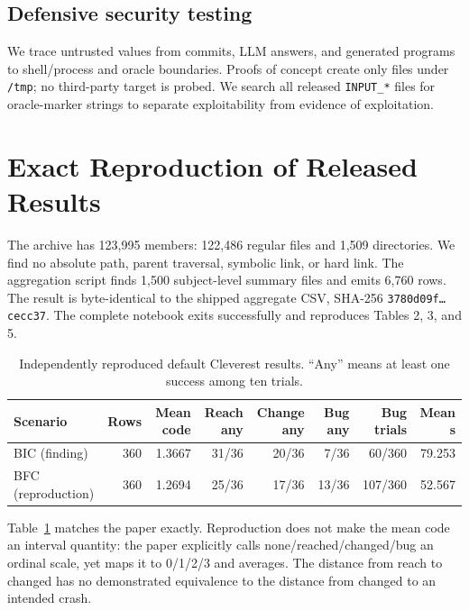 \documentclass{article}
\begin{document}
\subsection{Defensive security testing}

We trace untrusted values from commits, LLM answers, and generated programs to
shell/process and oracle boundaries.  Proofs of concept create only files under
\texttt{/tmp}; no third-party target is probed.  We search all released
\texttt{INPUT\_*} files for oracle-marker strings to separate exploitability
from evidence of exploitation.

\section{Exact Reproduction of Released Results}
\label{sec:reproduction}

The archive has 123,995 members: 122,486 regular files and 1,509 directories.
We find no absolute path, parent traversal, symbolic link, or hard link.  The
aggregation script finds 1,500 subject-level summary files and emits 6,760
rows.  The result is byte-identical to the shipped aggregate CSV, SHA-256
\texttt{3780d09f\ldots cecc37}.  The complete notebook exits successfully and
reproduces Tables 2, 3, and 5.

\begin{table}[H]
\centering
\caption{Independently reproduced default Cleverest results.  ``Any'' means at
least one success among ten trials.}
\label{tab:default}
\small
\begin{tabular}{lrrrrrrr}
\toprule
Scenario & Rows & Mean code & Reach any & Change any & Bug any & Bug trials & Mean s\\
\midrule
BIC (finding) & 360 & 1.3667 & 31/36 & 20/36 & 7/36 & 60/360 & 79.253\\
BFC (reproduction) & 360 & 1.2694 & 25/36 & 17/36 & 13/36 & 107/360 & 52.567\\
\bottomrule
\end{tabular}
\end{table}

Table~\ref{tab:default} matches the paper exactly.  Reproduction does not make
the mean code an interval quantity: the paper explicitly calls
none/reached/changed/bug an ordinal scale, yet maps it to 0/1/2/3 and averages.
The distance from reach to changed has no demonstrated equivalence to the
distance from changed to an intended crash.
\end{document}
